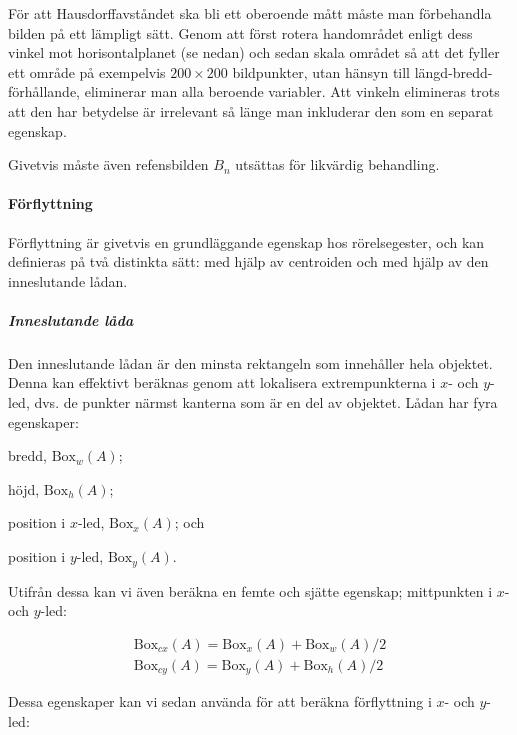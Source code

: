 \documentclass[../rapport_MVEX01-11-05]{subfiles}
\begin{document}
För att Hausdorffavståndet ska bli ett oberoende mått måste man
förbehandla bilden på ett lämpligt sätt. Genom att först rotera
handområdet enligt dess vinkel mot horisontalplanet (se nedan)
och sedan skala området så att det fyller ett
område på exempelvis $200\times200$ bildpunkter, utan hänsyn till
längd-bredd-förhållande, eliminerar man alla beroende variabler. Att
vinkeln elimineras trots att den har betydelse är irrelevant så länge
man inkluderar den som en separat egenskap.

Givetvis måste även refensbilden $B_n$ utsättas för likvärdig behandling.

\paragraph{Förflyttning}

Förflyttning är givetvis en grundläggande egenskap hos rörelsegester,
och kan definieras på två distinkta sätt: med hjälp av centroiden och
med hjälp av den inneslutande lådan.


\subparagraph{Inneslutande låda}

Den inneslutande lådan är den minsta rektangeln som innehåller hela
objektet. Denna kan effektivt beräknas genom att lokalisera
extrempunkterna i $x$- och $y$-led, dvs. de punkter närmst kanterna
som är en del av objektet. Lådan har fyra egenskaper:
\begin{inparaenum}[\itshape 1\upshape)]
  \item bredd, $\textrm{Box}_w(A)$;
  \item höjd, $\textrm{Box}_h(A)$;
  \item position i $x$-led, $\textrm{Box}_x(A)$; och
  \item position i $y$-led, $\textrm{Box}_y(A)$.
\end{inparaenum}

Utifrån dessa kan vi även beräkna en femte och sjätte egenskap;
mittpunkten i $x$- och $y$-led:

\begin{gather*}
  \textrm{Box}_{cx}(A) = \textrm{Box}_x(A) + \textrm{Box}_w(A)/2\\
  \textrm{Box}_{cy}(A) = \textrm{Box}_y(A) + \textrm{Box}_h(A)/2
\end{gather*}

Dessa egenskaper kan vi sedan använda för att beräkna förflyttning i
$x$- och $y$-led:
\end{document}
